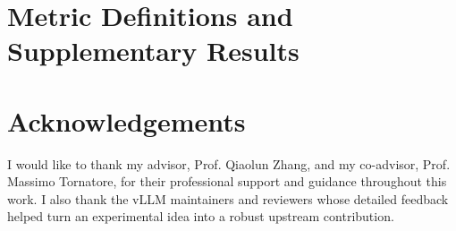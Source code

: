 \documentclass{Configuration_Files/PoliMi3i_thesis}
\begin{document}
\chapter{Metric Definitions and Supplementary Results}


\chapter*{Acknowledgements}
I would like to thank my advisor, Prof. Qiaolun Zhang, and my
co-advisor, Prof. Massimo Tornatore, for their professional support and guidance
throughout this work. I also thank the vLLM maintainers and reviewers whose
detailed feedback helped turn an experimental idea into a robust upstream
contribution.

\cleardoublepage
\end{document}
